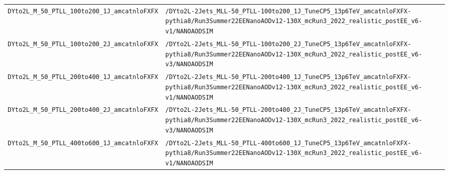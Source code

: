 \begin{longtable}{@{}>{\RaggedRight\arraybackslash}p{} >{\RaggedRight\arraybackslash}p{}@{}}
\addlinespace[2pt]
\texttt{DYto2L\_\allowbreak{}M\_\allowbreak{}50\_\allowbreak{}PTLL\_\allowbreak{}100to200\_\allowbreak{}1J\_\allowbreak{}amcatnloFXFX} & \texttt{/\allowbreak{}DYto2L-\allowbreak{}2Jets\_\allowbreak{}MLL-\allowbreak{}50\_\allowbreak{}PTLL-\allowbreak{}100to200\_\allowbreak{}1J\_\allowbreak{}TuneCP5\_\allowbreak{}13p6TeV\_\allowbreak{}amcatnloFXFX-\allowbreak{}pythia8/\allowbreak{}Run3Summer22EENanoAODv12-\allowbreak{}130X\_\allowbreak{}mcRun3\_\allowbreak{}2022\_\allowbreak{}realistic\_\allowbreak{}postEE\_\allowbreak{}v6-\allowbreak{}v1/\allowbreak{}NANOAODSIM} \\
\addlinespace[2pt]
\texttt{DYto2L\_\allowbreak{}M\_\allowbreak{}50\_\allowbreak{}PTLL\_\allowbreak{}100to200\_\allowbreak{}2J\_\allowbreak{}amcatnloFXFX} & \texttt{/\allowbreak{}DYto2L-\allowbreak{}2Jets\_\allowbreak{}MLL-\allowbreak{}50\_\allowbreak{}PTLL-\allowbreak{}100to200\_\allowbreak{}2J\_\allowbreak{}TuneCP5\_\allowbreak{}13p6TeV\_\allowbreak{}amcatnloFXFX-\allowbreak{}pythia8/\allowbreak{}Run3Summer22EENanoAODv12-\allowbreak{}130X\_\allowbreak{}mcRun3\_\allowbreak{}2022\_\allowbreak{}realistic\_\allowbreak{}postEE\_\allowbreak{}v6-\allowbreak{}v3/\allowbreak{}NANOAODSIM} \\
\addlinespace[2pt]
\texttt{DYto2L\_\allowbreak{}M\_\allowbreak{}50\_\allowbreak{}PTLL\_\allowbreak{}200to400\_\allowbreak{}1J\_\allowbreak{}amcatnloFXFX} & \texttt{/\allowbreak{}DYto2L-\allowbreak{}2Jets\_\allowbreak{}MLL-\allowbreak{}50\_\allowbreak{}PTLL-\allowbreak{}200to400\_\allowbreak{}1J\_\allowbreak{}TuneCP5\_\allowbreak{}13p6TeV\_\allowbreak{}amcatnloFXFX-\allowbreak{}pythia8/\allowbreak{}Run3Summer22EENanoAODv12-\allowbreak{}130X\_\allowbreak{}mcRun3\_\allowbreak{}2022\_\allowbreak{}realistic\_\allowbreak{}postEE\_\allowbreak{}v6-\allowbreak{}v1/\allowbreak{}NANOAODSIM} \\
\addlinespace[2pt]
\texttt{DYto2L\_\allowbreak{}M\_\allowbreak{}50\_\allowbreak{}PTLL\_\allowbreak{}200to400\_\allowbreak{}2J\_\allowbreak{}amcatnloFXFX} & \texttt{/\allowbreak{}DYto2L-\allowbreak{}2Jets\_\allowbreak{}MLL-\allowbreak{}50\_\allowbreak{}PTLL-\allowbreak{}200to400\_\allowbreak{}2J\_\allowbreak{}TuneCP5\_\allowbreak{}13p6TeV\_\allowbreak{}amcatnloFXFX-\allowbreak{}pythia8/\allowbreak{}Run3Summer22EENanoAODv12-\allowbreak{}130X\_\allowbreak{}mcRun3\_\allowbreak{}2022\_\allowbreak{}realistic\_\allowbreak{}postEE\_\allowbreak{}v6-\allowbreak{}v3/\allowbreak{}NANOAODSIM} \\
\addlinespace[2pt]
\texttt{DYto2L\_\allowbreak{}M\_\allowbreak{}50\_\allowbreak{}PTLL\_\allowbreak{}400to600\_\allowbreak{}1J\_\allowbreak{}amcatnloFXFX} & \texttt{/\allowbreak{}DYto2L-\allowbreak{}2Jets\_\allowbreak{}MLL-\allowbreak{}50\_\allowbreak{}PTLL-\allowbreak{}400to600\_\allowbreak{}1J\_\allowbreak{}TuneCP5\_\allowbreak{}13p6TeV\_\allowbreak{}amcatnloFXFX-\allowbreak{}pythia8/\allowbreak{}Run3Summer22EENanoAODv12-\allowbreak{}130X\_\allowbreak{}mcRun3\_\allowbreak{}2022\_\allowbreak{}realistic\_\allowbreak{}postEE\_\allowbreak{}v6-\allowbreak{}v1/\allowbreak{}NANOAODSIM} \\

\end{longtable}
